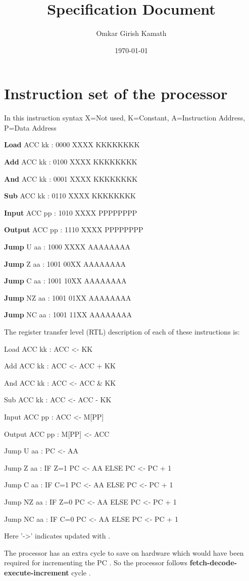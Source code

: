 \documentclass[11pt]{article}
\author{Omkar Girish Kamath}
\date{\today}
\title{Specification Document}
\begin{document}
\maketitle
\tableofcontents

\section{Instruction set of the processor}
\label{sec:org4f08230}

In this instruction syntax X=Not used, K=Constant, A=Instruction Address, P=Data Address

\textbf{Load} ACC kk : 0000 XXXX KKKKKKKK

\textbf{Add} ACC kk : 0100 XXXX KKKKKKKK

\textbf{And} ACC kk : 0001 XXXX KKKKKKKK

\textbf{Sub} ACC kk : 0110 XXXX KKKKKKKK

\textbf{Input} ACC pp : 1010 XXXX PPPPPPPP

\textbf{Output} ACC pp : 1110 XXXX PPPPPPPP

\textbf{Jump} U aa : 1000 XXXX AAAAAAAA

\textbf{Jump} Z aa : 1001 00XX AAAAAAAA

\textbf{Jump} C aa : 1001 10XX AAAAAAAA

\textbf{Jump} NZ aa : 1001 01XX AAAAAAAA

\textbf{Jump} NC aa : 1001 11XX AAAAAAAA

The register transfer level (RTL) description of each of these instructions is:

Load ACC kk : ACC <- KK

Add ACC kk : ACC <- ACC + KK

And ACC kk : ACC <- ACC \& KK

Sub ACC kk : ACC <- ACC - KK

Input ACC pp : ACC <- M[PP]

Output ACC pp : M[PP] <- ACC

Jump U aa : PC <- AA

Jump Z aa : IF Z=1 PC <- AA ELSE PC <- PC + 1

Jump C aa : IF C=1 PC <- AA ELSE PC <- PC + 1

Jump NZ aa : IF Z=0 PC <- AA ELSE PC <- PC + 1

Jump NC aa : IF C=0 PC <- AA ELSE PC <- PC + 1

Here '->' indicates updated with .

The processor has an extra cycle to save on hardware which would have been required for incrementing the PC . So the processor follows \textbf{fetch-decode-execute-increment} cycle .   
\end{document}
